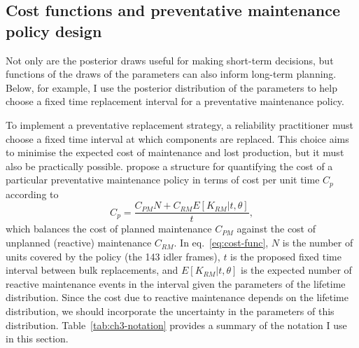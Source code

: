 \subsection{Cost functions and preventative maintenance policy design} \label{subsec:idler-cost-function}

Not only are the posterior draws useful for making short-term decisions, but functions of the draws of the parameters can also inform long-term planning. Below, for example, I use the posterior distribution of the parameters to help choose a fixed time replacement interval for a preventative maintenance policy.

To implement a preventative replacement strategy, a reliability practitioner must choose a fixed time interval at which components are replaced. This choice aims to minimise the expected cost of maintenance and lost production, but it must also be practically possible. \citet{jardine2013} propose a structure for quantifying the cost of a particular preventative maintenance policy in terms of cost per unit time $C_p$ according to
\begin{equation}
  \label{eq:cost-func}
 C_p = \frac{C_{PM} N + C_{RM} E[K_{RM}|t,\theta]}{t},
\end{equation}
which balances the cost of planned maintenance $C_{PM}$ against the cost of unplanned (reactive) maintenance $C_{RM}$. In eq.~\eqref{eq:cost-func}, $N$ is the number of units covered by the policy (the 143 idler frames), $t$ is the proposed fixed time interval between bulk replacements, and $E[K_{RM}|t,\theta]$ is the expected number of reactive maintenance events in the interval given the parameters of the lifetime distribution. Since the cost due to reactive maintenance depends on the lifetime distribution, we should incorporate the uncertainty in the parameters of this distribution. Table~\ref{tab:ch3-notation} provides a summary of the notation I use in this section.

